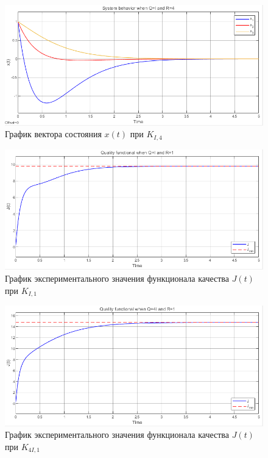 \documentclass[a4paper, 12pt]{article}
\begin{document}
    \begin{figure}[H]
        \centering
        \includegraphics[scale=0.75]{1task_xxx.png}
        \captionsetup{skip=0pt}
        \caption{График вектора состояния $x(t)$ при $K_{I,4}$}
        \label{fig:1task_xxx}
    \end{figure}
    \begin{figure}[H]
        \centering
        \includegraphics[scale=0.75]{1task_j.png}
        \captionsetup{skip=0pt}
        \caption{График экспериментального значения функционала качества $J(t)$ при $K_{I,1}$}
        \label{fig:1task_j}
    \end{figure}
    \begin{figure}[H]
        \centering
        \includegraphics[scale=0.75]{1task_jj.png}
        \captionsetup{skip=0pt}
        \caption{График экспериментального значения функционала качества $J(t)$ при $K_{4I,1}$}
        \label{fig:1task_jj}
    \end{figure}
\end{document}
